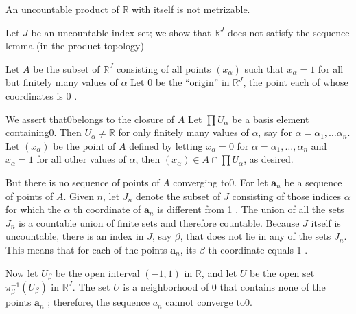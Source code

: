 \begin{centeredblock}
\begin{example}
\label{ex:\thesection.\theexample}
 An uncountable product of \(\mathbb{R}\) with itself is not metrizable.

 Let \(J\) be an uncountable index set; we show that \(\mathbb{R}^{J}\) does not satisfy the sequence lemma (in the product topology)

 Let \(A\) be the subset of \(\mathbb{R}^{J}\) consisting of all points \(( x_{\alpha })\) such that \(x_{\alpha } = 1\) for all but finitely many values of \(\alpha\) Let 0 be the ``origin'' in \(\mathbb{R}^{J}\), the point each of whose coordinates is 0 .

 We assert that0belongs to the closure of \(A\) Let \(\prod {U}_{\alpha }\) be a basis element containing0. Then \(U_{\alpha } \neq \mathbb{R}\) for only finitely many values of \(\alpha\), say for \(\alpha = {\alpha }_{1},\ldots {\alpha }_{n}\). Let \(( x_{\alpha })\) be the point of \(A\) defined by letting \(x_{\alpha } = 0\) for \(\alpha = {\alpha }_{1},\ldots,{\alpha }_{n}\) and \(x_{\alpha } = 1\) for all other values of \(\alpha\), then \(( x_{\alpha }) \in A \cap \prod {U}_{\alpha }\), as desired.

 But there is no sequence of points of \(A\) converging to0. For let \(\mathbf{a}_{n}\) be a sequence of points of \(A\). Given \(n\), let \(J_{n}\) denote the subset of \(J\) consisting of those indices \(\alpha\) for which the \(\alpha\) th coordinate of \(\mathbf{a}_{n}\) is different from 1 . The union of all the sets \(J_{n}\) is a countable union of finite sets and therefore countable. Because \(J\) itself is uncountable, there is an index in \(J\), say \(\beta\), that does not lie in any of the sets \(J_{n}\). This means that for each of the points \(\mathbf{a}_{n}\), its \(\beta\) th coordinate equals 1 .

 Now let \(U_{\beta }\) be the open interval \((-1, 1)\) in \(\mathbb{R}\), and let \(U\) be the open set \({\pi }_{\beta }^{-1}( U_{\beta })\) in \(\mathbb{R}^{J}\). The set \(U\) is a neighborhood of 0 that contains none of the points \(\mathbf{a}_{n}\) ; therefore, the sequence \(a_{n}\) cannot converge to0.
\end{example}
\end{centeredblock}

